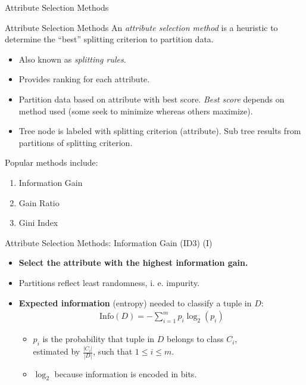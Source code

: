 \begin{frame}{Attribute Selection Methods}
	\begin{block}{Attribute Selection Methods}
		An \textit{attribute selection method} is a heuristic to determine the ``best'' splitting criterion to partition data.
	\end{block}

	\begin{itemize}
		\item Also known as \textit{splitting rules}.
		\item Provides ranking for each attribute.
		\item Partition data based on attribute with best score. \textit{Best score} depends on method used (some seek to minimize whereas others maximize).
		\item Tree node is labeled with splitting criterion (attribute). Sub tree results from partitions of splitting criterion.
	\end{itemize}

	Popular methods include:
	\begin{enumerate}
		\item Information Gain
		\item Gain Ratio
		\item Gini Index
	\end{enumerate}
\end{frame}

\begin{frame}{Attribute Selection Methods: Information Gain (ID3) (I)}
	\begin{itemize}
		\item \textbf{Select the attribute with the highest information gain.}
		\item Partitions reflect least randomness, i. e. impurity.
		\item \textbf{Expected information} (entropy) needed to classify a tuple in $D$:
		      \begin{align*}
			      \text{Info}(D) = -\sum_{i=1}^{m}p_i \log_2(p_i)
		      \end{align*}

		      \begin{itemize}
			      \item $p_i$ is the probability that tuple in $D$ belongs to class $C_i$,\\
			            estimated by $\frac{|C_i|}{|D|}$, such that $1 \leq i \leq m$.
			      \item $\log_2$ because information is encoded in bits.
		      \end{itemize}
	\end{itemize}
\end{frame}

